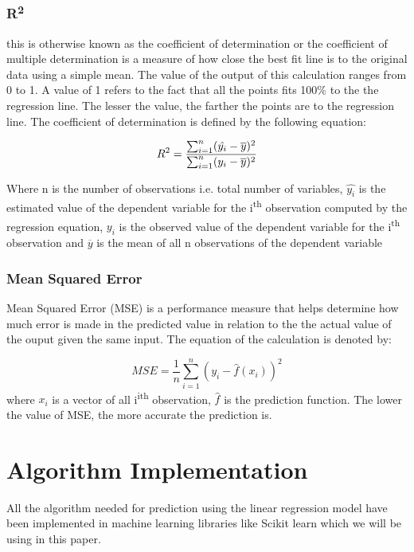 \documentclass[conference]{IEEEtran}
\begin{document}
\subsubsection{R\textsuperscript{2}}
this is otherwise known as the coefficient of determination or the coefficient of multiple determination is a measure of how close the best fit line is to the original data using a simple mean. The value of the output of this calculation ranges from 0 to 1\cite{DAE79009}. A value of 1 refers to the fact that all the points fits 100$\%$ to the the regression line. The lesser the value, the farther the points are to the regression line. The coefficient of determination is defined by the following equation:

	\begin{equation}
		R\textsuperscript{2} = \label{three}\frac{\sum_{i=1}^{n}(\hat{y_i}-\overline{y})^2}{\sum_{i=1}^{n}(y_i-\overline{y})^2}
	\end{equation}
	
	Where n is the number of observations i.e. total number of variables, $\hat{y_i}$ is the estimated value of the dependent variable for the i\textsuperscript{th} observation computed by the regression equation, $y_i$ is the observed value of the dependent variable for the i\textsuperscript{th} observation and $\overline{y}$ is the mean of all n observations of the dependent variable \cite{DAE79009}

\subsubsection{Mean Squared Error}
Mean Squared Error (MSE) is a performance measure that helps determine how much error is made in the predicted value in relation to the the actual value of the ouput given the same input. The equation of the calculation is denoted by:

	\begin{equation}
		MSE = \label{four}\frac{1}{n}\sum_{i=1}^{n}(y_i-\hat{f}(x_i))^2
	\end{equation}
	where $x_i$ is a vector of all i\textsuperscript{ith} observation, $\hat{f}$ is the prediction function. The lower the value of MSE, the more accurate the prediction is.
\section{Algorithm Implementation}
All the algorithm needed  for prediction using the linear regression model have been implemented in machine learning libraries like Scikit learn which we will be using in this paper.
\end{document}
